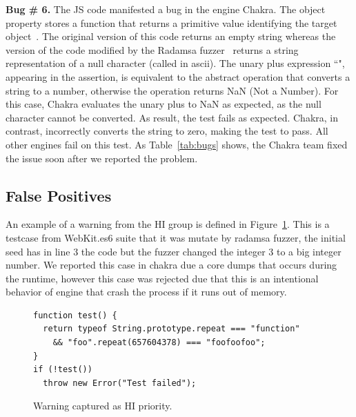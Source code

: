 \documentclass[10pt,conference,anonymous]{IEEEtran}
\begin{document}
\vspace{1ex}\noindent\textbf{Bug \# 6.} The JS code  
manifested a bug in the \js{} engine Chakra.  The object
property  stores a function that returns a primitive
value identifying the target object~\cite{valueof}. The original
version of this code returns an empty string whereas the version of
the code modified by the Radamsa fuzzer~\cite{radamsa} returns a string
representation of a null character (called  in ascii). The
unary plus expression ``", appearing in the assertion, is
equivalent to the abstract operation 
that converts a string to a number, otherwise the operation returns
NaN (Not a Number)\cite{unary-plus}. For this case, Chakra evaluates
the unary plus to NaN as expected, as the null character cannot be
converted. As result, the test fails as expected. Chakra, in contrast,
incorrectly converts the string to zero, making the test to pass. All
other engines fail on this test. As Table~\ref{tab:bugs} shows, the
Chakra team fixed the issue soon after we reported the problem.

\subsection{False Positives}

An example of a warning from the HI group is defined in Figure~\ref{fig:hi-priority}. 
This is a testcase from WebKit.es6 suite that it was mutate by radamsa fuzzer, the 
initial seed has in line 3 the code  but the fuzzer changed the 
integer 3 to a big integer number. We reported this case in chakra due a core dumps that occurs
during the runtime, however this case was rejected due  that
this is an intentional behavior of engine that crash the process if it runs out of memory.

\begin{figure}[h!]
  \centering
  \scriptsize
  \begin{lstlisting}
function test() {
  return typeof String.prototype.repeat === "function"
    && "foo".repeat(657604378) === "foofoofoo";
}
if (!test())
  throw new Error("Test failed");
  \end{lstlisting}
  \normalsize
  \caption{Warning captured as HI priority.}
  \label{fig:hi-priority}
  \end{figure}
\end{document}
